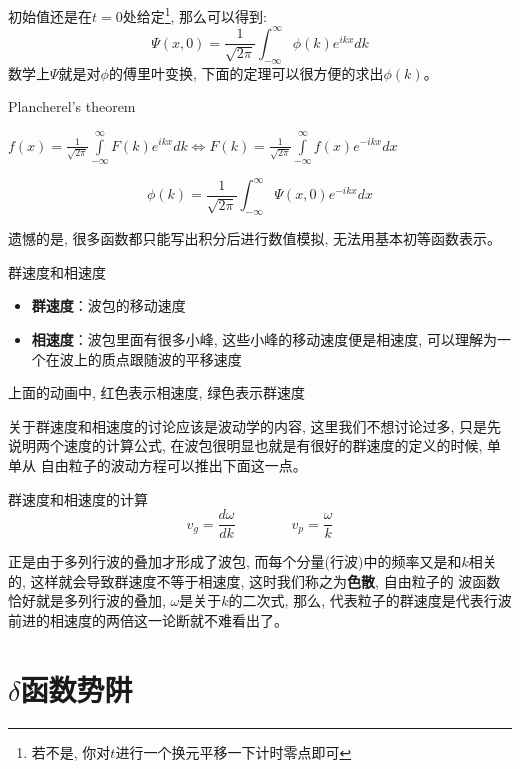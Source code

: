 \documentclass[a4paper,zihao=-4,linespread=1]{ctexrep}
\newenvironment{lequation}{\large\begin{equation}}{\end{equation}}
\begin{document}
    初始值还是在$t=0$处给定\footnote[1]{若不是, 你对$t$进行一个换元平移一下计时零点即可}, 那么可以得到:
    \begin{lequation}
        \Psi(x,0)=\frac{1}{\sqrt{2\pi}}\int_{-\infty}^{\infty}\phi(k)e^{ikx}dk  
    \end{lequation}
    数学上$\Psi$就是对$\phi$的傅里叶变换, 下面的定理可以很方便的求出$\phi(k)$。
    \begin{theorem}{Plancherel's theorem}
        \begin{center}
            \begin{math}
                \displaystyle
                f(x)=\frac{1}{\sqrt{2\pi}} \int\limits_{-\infty}^{\infty}F(k)e^{ikx}dk\Longleftrightarrow F(k)=\frac{1}{\sqrt{2\pi}} \int\limits_{-\infty}^{\infty}f(x)e^{-ikx}dx
            \end{math}
        \end{center}
    \end{theorem}
    \begin{lequation}
        \boxed{
            \phi(k)=\frac{1}{\sqrt{2\pi}} \int _{-\infty}^{\infty}\Psi(x,0)e^{-ikx}dx
        }
    \end{lequation}
    
    遗憾的是, 很多函数都只能写出积分后进行数值模拟, 无法用基本初等函数表示。
    \begin{define}{群速度和相速度}
        \begin{itemize}
            \item \textbf{群速度}：波包的移动速度
            \item \textbf{相速度}：波包里面有很多小峰, 这些小峰的移动速度便是相速度, 可以理解为一个在波上的质点跟随波的平移速度
        \end{itemize}
    \end{define}
    \begin{center}
        上面的动画中, {\color{red}红色}表示相速度, {\color{green}绿色}表示群速度
    \end{center}
    
    关于群速度和相速度的讨论应该是波动学的内容, 这里我们不想讨论过多, 只是先说明两个速度的计算公式, 在波包很明显也就是有很好的群速度的定义的时候, 单单从
    自由粒子的波动方程可以推出下面这一点。
    \begin{theorem}{群速度和相速度的计算}
        \begin{lequation}
            \boxed{
               v_g=\frac{d\omega}{dk}\qquad\qquad v_p=\frac{\omega}{k} 
            }
        \end{lequation}
    \end{theorem}
    正是由于多列行波的叠加才形成了波包, 而每个分量(行波)中的频率又是和$k$相关的, 这样就会导致群速度不等于相速度, 这时我们称之为\textbf{色散}, 自由粒子的
    波函数恰好就是多列行波的叠加, $\omega$是关于$k$的二次式, 那么, 代表粒子的群速度是代表行波前进的相速度的两倍这一论断就不难看出了。
    \section{\texorpdfstring{$\delta$}.函数势阱}
    
\end{document}
